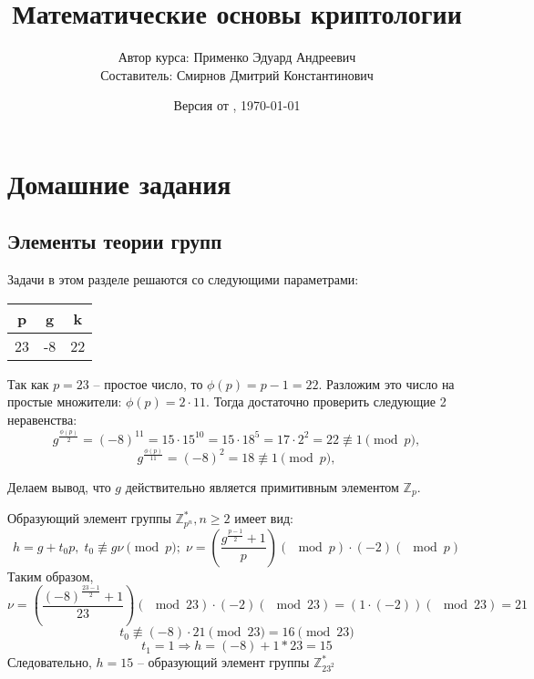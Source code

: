 \documentclass[a4paper,11pt,openany]{book}
\title{Математические основы криптологии}
\author{Автор курса: Применко Эдуард Андреевич \\ 
		Составитель: Смирнов Дмитрий Константинович}
\date{Версия от \currenttime, \today}
\begin{document}
\maketitle
\tableofcontents

\mainmatter
\chapter{Домашние задания}

\section{Элементы теории групп}

Задачи в этом разделе решаются со следующими параметрами:

\medskip

{\centering
\begin{tabular}{||c|c|c||}
\hline
\textbf{p} & \textbf{g} & \textbf{k} \\
\hline
23 & -8 & 22 \\
\hline
\end{tabular}

}

\medskip


Так как $p = 23$ -- простое число, то $\phi(p) = p - 1 = 22$. Разложим это число на простые множители: $\phi(p) = 2 \cdot 11$. Тогда достаточно проверить следующие 2 неравенства:
$$ g^{ \frac{\phi(p)}{2} } = (-8) ^ {11} = 15 \cdot 15 ^ {10} = 15 \cdot 18 ^ 5 = 17 \cdot 2 ^ 2 = 22 \not\equiv 1 \pmod p,$$
$$ g^{ \frac{\phi(p)}{11} } = (-8) ^ {2} = 18 \not\equiv 1 \pmod p,$$

Делаем вывод, что $g$ действительно является примитивным элементом $\mathbb{Z}_p$.


Образующий элемент группы $\mathbb{Z}_{p^n}^*, n \ge 2$ имеет вид:
$$ h = g + t_0 p, \; t_0 \not \equiv g \nu \pmod p; \; \nu = ( \frac{ g ^ {\frac{p -1}{2}} + 1}{ p } )(\!\!\!\!\!\! \mod p) \cdot (-2)(\!\!\!\!\!\! \mod p)$$
\noindent Таким образом,
$$ \nu = ( \frac{ (-8) ^ {\frac{23 - 1}{2}} + 1}{ 23 } )(\!\!\!\!\!\! \mod 23) \cdot (-2)(\!\!\!\!\!\! \mod 23) = ( 1 \cdot (-2))(\!\!\!\!\!\! \mod 23) = 21$$
$$ t_0 \not \equiv (-8) \cdot 21 \!\!\!\pmod {23} = 16 \!\!\!\pmod {23} $$
$$ t_1 = 1 \Rightarrow h = (-8) + 1 * 23 = 15 $$
Следовательно, $h = 15$ -- образующий элемент группы $\mathbb{Z}_{23^2}^*$
\end{document}
